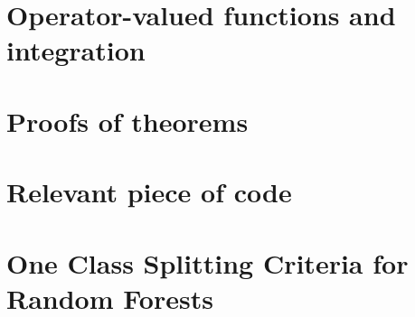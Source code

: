 
\chapter{Operator-valued functions and integration}
\label{ch:operator-valued_functions_and_integration}

\chapter{Proofs of theorems}
\label{ch:proof_of_theorems}


\chapter{Relevant piece of code}
\label{ch:relevant_piece_of_code}


\chapter{One Class Splitting Criteria for Random Forests}
\label{ch:one_class_splitting}


